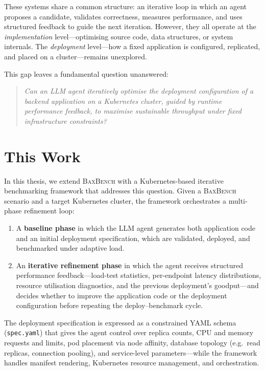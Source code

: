 These systems share a common structure: an iterative loop in which an agent
proposes a candidate, validates correctness, measures performance, and uses
structured feedback to guide the next iteration.  However, they all operate at
the \emph{implementation} level---optimising source code, data structures, or
system internals.  The \emph{deployment} level---how a fixed application is
configured, replicated, and placed on a cluster---remains unexplored.

This gap leaves a fundamental question unanswered:
%
\begin{quote}
  \emph{Can an LLM agent iteratively optimise the deployment configuration of
  a backend application on a Kubernetes cluster, guided by runtime performance
  feedback, to maximise sustainable throughput under fixed infrastructure
  constraints?}
\end{quote}


\section{This Work}
\label{sec:intro-thiswork}

In this thesis, we extend \textsc{BaxBench} with a Kubernetes-based iterative
benchmarking framework that addresses this question.  Given a
\textsc{BaxBench} scenario and a target Kubernetes cluster, the framework
orchestrates a multi-phase refinement loop:
%
\begin{enumerate}
  \item A \textbf{baseline phase} in which the LLM agent generates both
        application code and an initial deployment specification, which are
        validated, deployed, and benchmarked under adaptive load.
  \item An \textbf{iterative refinement phase} in which the agent receives
        structured performance feedback---load-test statistics, per-endpoint
        latency distributions, resource utilisation diagnostics, and the
        previous deployment's goodput---and decides whether to improve the
        application code or the deployment configuration before repeating the
        deploy--benchmark cycle.
\end{enumerate}
%
The deployment specification is expressed as a constrained YAML schema
(\texttt{spec.yaml}) that gives the agent control over replica counts, CPU and
memory requests and limits, pod placement via node affinity, database topology
(e.g.\ read replicas, connection pooling), and service-level parameters---while
the framework handles manifest rendering, Kubernetes resource management, and
orchestration.

